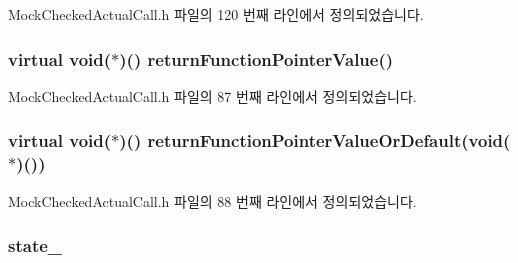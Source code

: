 Mock\+Checked\+Actual\+Call.\+h 파일의 120 번째 라인에서 정의되었습니다.

\subsubsection[{\texorpdfstring{return\+Function\+Pointer\+Value}{returnFunctionPointerValue}}]{\setlength{\rightskip}{0pt plus 5cm}virtual void($\ast$)() return\+Function\+Pointer\+Value()}\hypertarget{class_mock_checked_actual_call_abd8adc7ad48025440b2a4aee485f560d}{}\label{class_mock_checked_actual_call_abd8adc7ad48025440b2a4aee485f560d}


Mock\+Checked\+Actual\+Call.\+h 파일의 87 번째 라인에서 정의되었습니다.

\subsubsection[{\texorpdfstring{return\+Function\+Pointer\+Value\+Or\+Default}{returnFunctionPointerValueOrDefault}}]{\setlength{\rightskip}{0pt plus 5cm}virtual void($\ast$)() return\+Function\+Pointer\+Value\+Or\+Default(void($\ast$)())}\hypertarget{class_mock_checked_actual_call_af9c6303587f8f06ff55e48340ee3db5e}{}\label{class_mock_checked_actual_call_af9c6303587f8f06ff55e48340ee3db5e}


Mock\+Checked\+Actual\+Call.\+h 파일의 88 번째 라인에서 정의되었습니다.

\subsubsection[{\texorpdfstring{state\+\_\+}{state_}}]{ state\+\_\+\hspace{0.3cm}{\ttfamily [private]}}\hypertarget{class_mock_checked_actual_call_a9b5ca51a5cc79a6f6c83f0f327432078}{}\label{class_mock_checked_actual_call_a9b5ca51a5cc79a6f6c83f0f327432078}


